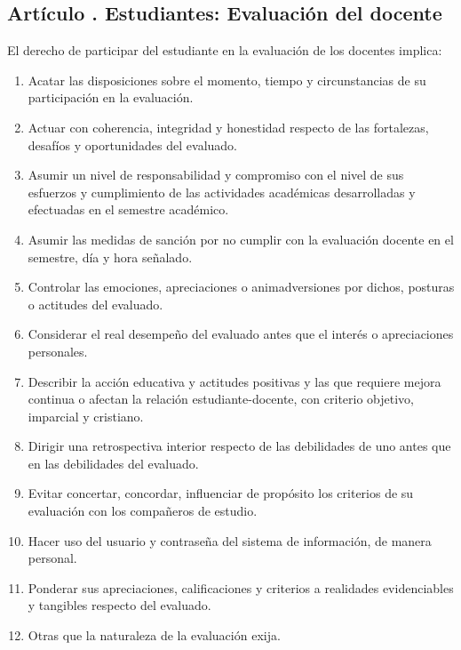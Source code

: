 \subsection{Artículo . Estudiantes: Evaluación del docente}
\addtocounter{ns}{1}
El derecho de participar del estudiante en la evaluación de los docentes implica:  
\begin{enumerate}
\item Acatar las disposiciones sobre el momento, tiempo y circunstancias de su participación en la evaluación. 
\item Actuar con coherencia, integridad y honestidad respecto de las fortalezas, desafíos y oportunidades del evaluado. 
\item Asumir un nivel de responsabilidad y compromiso con el nivel de sus esfuerzos y cumplimiento de las actividades académicas desarrolladas y efectuadas en el semestre académico. 
\item Asumir las medidas de sanción por no cumplir con la evaluación docente en el semestre, día y hora señalado. 
\item Controlar las emociones, apreciaciones o animadversiones por dichos, posturas o actitudes del evaluado. 
\item Considerar el real desempeño del evaluado antes que el interés o apreciaciones personales. 
\item Describir la acción educativa y actitudes positivas y las que requiere mejora continua o afectan la relación estudiante-docente, con criterio objetivo, imparcial y cristiano. 
\item Dirigir una retrospectiva interior respecto de las debilidades de uno antes que en las debilidades del evaluado. 
\item Evitar concertar, concordar, influenciar de propósito los criterios de su evaluación con los compañeros de estudio. 
\item Hacer uso del usuario y contraseña del sistema de información, de manera personal. 
\item Ponderar sus apreciaciones, calificaciones y criterios a realidades evidenciables y tangibles respecto del evaluado. 
\item Otras que la naturaleza de la evaluación exija. 
\end{enumerate}
